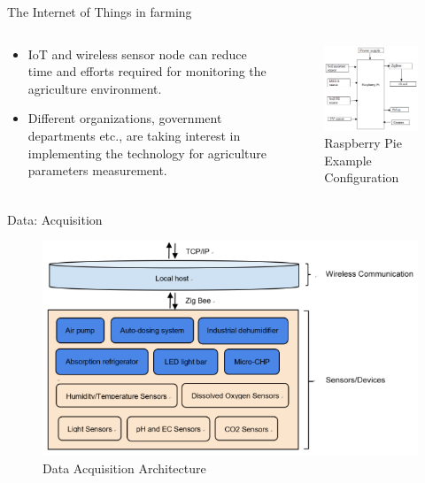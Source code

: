 \documentclass[presentation]{beamer}
\begin{document}
\begin{frame}[label={sec:org0abf73e}]{The Internet of Things in farming}
\begin{columns}
\begin{column}{0.5\columnwidth}
\begin{itemize}
\item IoT and wireless sensor node can
reduce time and efforts required for
monitoring the agriculture
environment.
\item Different organizations, government
departments etc., are taking
interest in implementing the
technology for agriculture
parameters measurement.
\end{itemize}
\end{column}
\begin{column}{0.5\columnwidth}
\begin{figure}[htbp]
\centering
\includegraphics[width=.9\linewidth]{./images/config.png}
\caption{Raspberry Pie Example Configuration}
\end{figure}
\end{column}
\end{columns}
\end{frame}
\begin{frame}[label={sec:orgeaad533}]{Data: Acquisition}
\begin{figure}[htbp]
\centering
\includegraphics[width=.9\linewidth]{./images/dataaq.png}
\caption{Data Acquisition Architecture}
\end{figure}
\end{frame}
\end{document}
